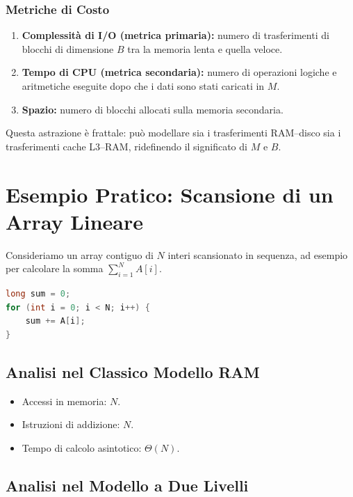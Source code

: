 \subsubsection{Metriche di Costo}

\begin{enumerate}
  \item \textbf{Complessità di I/O (metrica primaria):} numero di trasferimenti di blocchi di dimensione $B$ tra la memoria lenta e quella veloce.
  \item \textbf{Tempo di CPU (metrica secondaria):} numero di operazioni logiche e aritmetiche eseguite dopo che i dati sono stati caricati in $M$.
  \item \textbf{Spazio:} numero di blocchi allocati sulla memoria secondaria.
\end{enumerate}

Questa astrazione è frattale: può modellare sia i trasferimenti RAM--disco sia i trasferimenti cache L3--RAM, ridefinendo il significato di $M$ e $B$.

\FloatBarrier
\section{Esempio Pratico: Scansione di un Array Lineare}
\label{sec:linear-scan}

Consideriamo un array contiguo di $N$ interi scansionato in sequenza, ad esempio per calcolare la somma $\sum_{i=1}^{N} A[i]$.

\begin{lstlisting}[style=code, language=C, caption={Scansione sequenziale di un array}, label={lst:linear-scan}]
long sum = 0;
for (int i = 0; i < N; i++) {
    sum += A[i];
}
\end{lstlisting}

\FloatBarrier
\subsection{Analisi nel Classico Modello RAM}

\begin{itemize}
  \item Accessi in memoria: $N$.
  \item Istruzioni di addizione: $N$.
  \item Tempo di calcolo asintotico: $\Theta(N)$.
\end{itemize}

\FloatBarrier
\subsection{Analisi nel Modello a Due Livelli}

